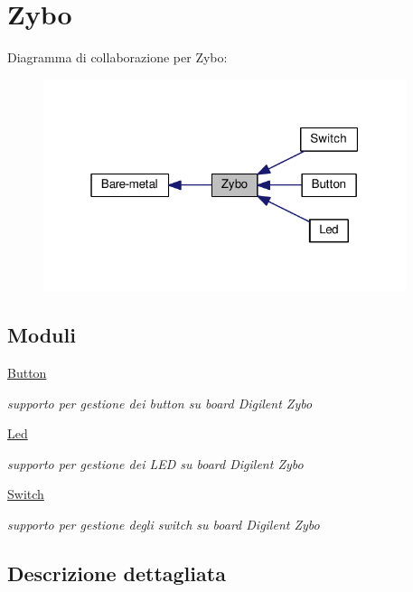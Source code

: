 \hypertarget{group___zybo}{\section{Zybo}
\label{group___zybo}
}
Diagramma di collaborazione per Zybo\+:\nopagebreak
\begin{figure}[H]
\begin{center}
\leavevmode
\includegraphics[width=301pt]{group___zybo}
\end{center}
\end{figure}
\subsection*{Moduli}
\begin{DoxyCompactItemize}
\item 
\hyperlink{group___button}{Button}
\begin{DoxyCompactList}\small\item\em supporto per gestione dei button su board Digilent Zybo \end{DoxyCompactList}\item 
\hyperlink{group___led}{Led}
\begin{DoxyCompactList}\small\item\em supporto per gestione dei L\+E\+D su board Digilent Zybo \end{DoxyCompactList}\item 
\hyperlink{group___switch}{Switch}
\begin{DoxyCompactList}\small\item\em supporto per gestione degli switch su board Digilent Zybo \end{DoxyCompactList}\end{DoxyCompactItemize}


\subsection{Descrizione dettagliata}
